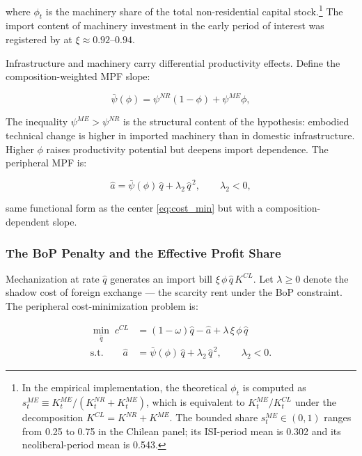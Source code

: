 \documentclass[11pt,a4paper]{article}
\begin{document}
{where $\phi_t$ is the machinery share of the total non-residential
capital stock.\footnote{In the empirical implementation, the theoretical $\phi_t$ is
	computed as $s_t^{ME} \equiv K_t^{ME}/(K_t^{NR}+K_t^{ME})$, which is
	equivalent to $K_t^{ME}/K_t^{CL}$ under the decomposition
	$K^{CL} = K^{NR} + K^{ME}$. The bounded share $s_t^{ME} \in (0,1)$
	ranges from 0.25 to 0.75 in the Chilean panel; its ISI-period mean
	is 0.302 and its neoliberal-period mean is 0.543.}
The import content of machinery investment in the early period of
interest was registered by \citet{Kaldor1959} at $\xi \approx 0.92$--$0.94$.

Infrastructure and machinery carry differential productivity effects.
Define the composition-weighted MPF slope:

\begin{equation}
	\bar{\psi}(\phi)
	=
	\psi^{NR}(1-\phi)+\psi^{ME}\phi,
	\label{eq:cl:psi_bar}
\end{equation}

The inequality $\psi^{ME} > \psi^{NR}$ is the structural content of
the \citet{Kaldor1959} hypothesis: embodied technical change is higher
in imported machinery than in domestic infrastructure. Higher $\phi$
raises productivity potential but deepens import dependence.
The peripheral MPF is:

\begin{equation}
	\hat{a}
	=
	\bar{\psi}(\phi)\,\hat{q}
	+
	\lambda_2\,\hat{q}^{\,2},
	\qquad
	\lambda_2 < 0,
	\label{eq:cl:mpf}
\end{equation}

same functional form as the center \eqref{eq:cost_min} but with a
composition-dependent slope.

\subsubsection{The BoP Penalty and the Effective Profit Share}
\label{subsec:chile_bop_penalty}

Mechanization at rate $\hat{q}$ generates an import bill
$\xi\,\phi\,\hat{q}\,K^{CL}$. Let $\lambda \geq 0$ denote the
shadow cost of foreign exchange --- the scarcity rent under the
BoP constraint. The peripheral cost-minimization problem is:

\begin{align}
	\min_{\hat{q}}\; c^{CL}
	&=
	(1-\omega)\hat{q}
	-
	\hat{a}
	+
	\lambda\,\xi\,\phi\,\hat{q}
	\label{eq:cl:cost_min}
	\\[4pt]
	\text{s.t.}\qquad
	\hat{a}
	&=
	\bar{\psi}(\phi)\,\hat{q}
	+
	\lambda_2\,\hat{q}^{\,2},
	\qquad
	\lambda_2<0.
	\label{eq:cl:mpf_constraint}
\end{align}

}
\end{document}

